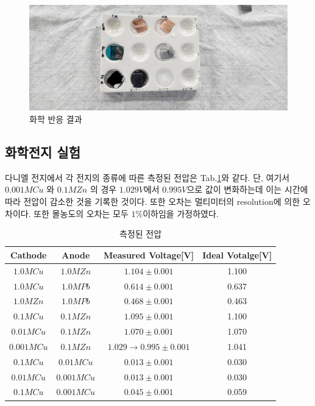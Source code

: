 \documentclass[%
 reprint,
 amsmath,amssymb,
 aps,
]{revtex4-2}
\begin{document}
\begin{figure}[htbp]
	\includegraphics[angle=90, width = 0.95\linewidth]{ChemREAC.png}%
	\caption{\label{fig:ChemREAC}화학 반응 결과}
\end{figure}

\subsection{\label{sec:level2}화학전지 실험}
다니엘 전지에서 각 전지의 종류에 따른 측정된 전압은 Tab.\ref{tab:chemvol}와 같다. 단, 여기서 $0.001M Cu$ 와 $0.1M Zn$ 의 경우 $1.029V$에서 $0.995V$으로 값이 변화하는데 이는 시간에 따라 전압이 감소한 것을 기록한 것이다. 또한 오차는 멀티미터의 resolution에 의한 오차이다. 또한 몰농도의 오차는 모두 $1\%$이하임을 가정하였다.
\begin{table}[]
\begin{tabular}{c|c|c|c} \hline \hline
 Cathode & Anode & Measured Voltage[V] & Ideal Votalge[V] \\ \hline
$1.0M Cu$ & $1.0M Zn$ & $1.104\pm0.001$ & 1.100 \\ \hline
$1.0M Cu$ & $1.0M Pb$ & $0.614\pm0.001$ & 0.637 \\  \hline
$1.0M Zn$ & $1.0M Pb$ & $0.468\pm0.001$ & 0.463 \\ \hline
$0.1M Cu$ & $0.1M Zn$ & $1.095\pm0.001$ & 1.100 \\ \hline
$0.01M Cu$ & $0.1M Zn$ & $1.070\pm0.001$ & 1.070 \\ \hline
$0.001M Cu$ & $0.1M Zn$ & $1.029 \rightarrow 0.995\pm0.001$ & 1.041 \\ \hline
$0.1M Cu$ & $0.01M Cu$ & $0.013\pm0.001$ & 0.030\\ \hline
$0.01M Cu$ & $0.001M Cu$ & $0.013\pm0.001$ & 0.030 \\ \hline
$0.1M Cu$ & $0.001M Cu$ & $0.045\pm0.001$ & 0.059 \\ \hline \hline 
\end{tabular}
\caption{\label{tab:chemvol}측정된 전압}
\end{table}
\end{document}
